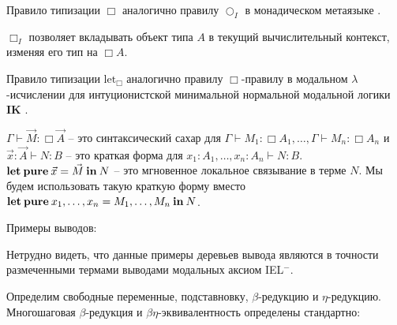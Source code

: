 Правило типизации $\Box$ аналогично правилу $\bigcirc_I$ в монадическом метаязыке \cite{Lax}.

$\Box_I$ позволяет вкладывать объект типа $A$ в текущий вычислительный контекст, изменяя его тип на $\Box A$.

Правило типизации $\text{let}_{\Box}$ аналогично правилу $\Box$-правилу в модальном $\lambda$-исчислении
для интуционистской минимальной нормальной модальной логики {\bf IK} \cite{ModalK}.

$\Gamma \vdash \vec{M} : \Box \vec{A}$ -- это синтаксический сахар для $\Gamma \vdash M_1 : \Box A_1,\dots,\Gamma \vdash M_n : \Box A_n$ и
$\vec{x} : \vec{A} \vdash N : B$ -- это краткая форма для $x_1 : A_1, \dots, x_n : A_n \vdash N : B$.
${\bf let \: pure \:} \vec{x} = \vec{M} {\: \bf in \: } N$ -- это мгновенное локальное связывание в терме $N$.
Мы будем использовать такую краткую форму вместо ${\bf let \: pure\:} x_1,\dots,x_n = M_1,\dots,M_n {\: \bf in \:} N$.

\vspace{\baselineskip}

Примеры выводов:

\begin{prooftree}
\end{prooftree}

\begin{prooftree}
\end{prooftree}

Нетрудно видеть, что данные примеры деревьев вывода являются в точности размеченными термами выводами модальных аксиом IEL$^{-}$.

\vspace{\baselineskip}

Определим свободные переменные, подставновку, $\beta$-редукцию и $\eta$-редукцию. Многошаговая $\beta$-редукция и $\beta \eta$-эквивалентность определены стандартно:

